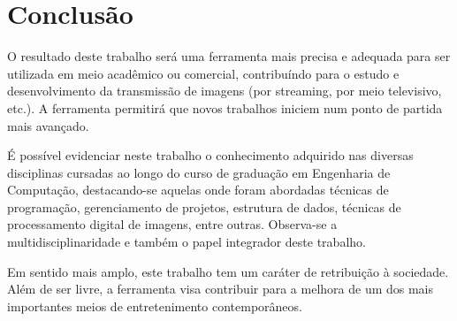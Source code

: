 \chapter{Conclusão}

O resultado deste trabalho será uma ferramenta mais precisa e adequada para ser utilizada em meio acadêmico ou comercial, contribuíndo para o estudo e desenvolvimento da transmissão de imagens (por streaming, por meio televisivo, etc.). A ferramenta permitirá que novos trabalhos iniciem num ponto de partida mais avançado. 

É possível evidenciar neste trabalho o conhecimento adquirido nas diversas disciplinas cursadas ao longo do curso de graduação em Engenharia de Computação, destacando-se aquelas onde foram abordadas técnicas de programação, gerenciamento de projetos, estrutura de dados, técnicas de processamento digital de imagens, entre outras. Observa-se a multidisciplinaridade e também o papel integrador deste trabalho.

Em sentido mais amplo, este trabalho tem um caráter de retribuição à sociedade. Além de ser livre, a ferramenta visa contribuir para a melhora de um dos mais importantes meios de entretenimento contemporâneos.
